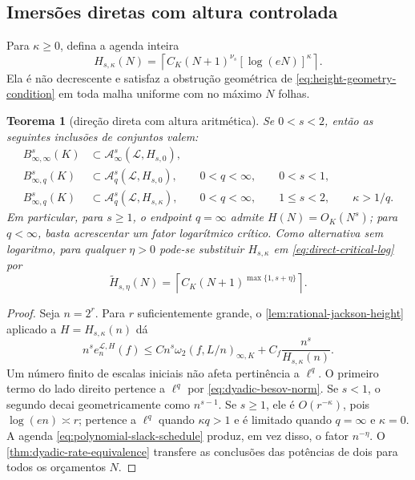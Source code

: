 \documentclass[11pt,a4paper]{article}
\newtheorem{theorem}{Teorema}[section]
\theoremstyle{definition}
\theoremstyle{remark}
\newcommand{\Library}{\mathcal{L}}
\begin{document}
\subsection{Imersões diretas com altura controlada}

Para $\kappa\ge0$, defina a agenda inteira
\begin{equation}
 H_{s,\kappa}(N)
 =\left\lceil C_K(N+1)^{\nu_s}
        [\log(eN)]^\kappa\right\rceil.
 \label{eq:corrected-height-schedule}
\end{equation}
Ela é não decrescente e satisfaz a obstrução geométrica de
\eqref{eq:height-geometry-condition} em toda malha uniforme com no máximo
$N$ folhas.

\begin{theorem}[direção direta com altura aritmética]
\label{thm:direct-besov-height}
Se $0<s<2$, então as seguintes inclusões de conjuntos valem:
\begin{align}
 B^s_{\infty,\infty}(K)
 &\subset
 \mathscr A^s_\infty(\Library,H_{s,0}),
 \label{eq:direct-endpoint}\\
 B^s_{\infty,q}(K)
 &\subset
 \mathscr A^s_q(\Library,H_{s,0}),
 &&0<q<\infty,\qquad 0<s<1,
 \label{eq:direct-subcritical}\\
 B^s_{\infty,q}(K)
 &\subset
 \mathscr A^s_q(\Library,H_{s,\kappa}),
 &&0<q<\infty,\qquad 1\le s<2,\qquad\kappa>1/q.
 \label{eq:direct-critical-log}
\end{align}
Em particular, para $s\ge1$, o endpoint $q=\infty$ admite
$H(N)=O_K(N^s)$; para $q<\infty$, basta acrescentar um fator logarítmico
crítico. Como
alternativa sem logaritmo, para qualquer $\eta>0$ pode-se substituir
$H_{s,\kappa}$ em \eqref{eq:direct-critical-log} por
\begin{equation}
 \widetilde H_{s,\eta}(N)
 =\left\lceil C_K(N+1)^{\max\{1,s+\eta\}}\right\rceil.
 \label{eq:polynomial-slack-schedule}
\end{equation}
\end{theorem}

\begin{proof}
Seja $n=2^r$. Para $r$ suficientemente grande, o
\cref{lem:rational-jackson-height} aplicado a
$H=H_{s,\kappa}(n)$ dá
\begin{equation}
 n^s e_n^{\Library,H}(f)
 \le C n^s\omega_2(f,L/n)_{\infty,K}
     +C_f\frac{n^s}{H_{s,\kappa}(n)}.
 \label{eq:direct-sequence-bound}
\end{equation}
Um número finito de escalas iniciais não afeta pertinência a $\ell^q$. O
primeiro termo do lado direito pertence a $\ell^q$ por
\eqref{eq:dyadic-besov-norm}. Se $s<1$, o segundo decai geometricamente como
$n^{s-1}$. Se $s\ge1$, ele é $O(r^{-\kappa})$, pois
$\log(en)\asymp r$; pertence a $\ell^q$ quando $\kappa q>1$ e é limitado
quando $q=\infty$ e $\kappa=0$. A agenda
\eqref{eq:polynomial-slack-schedule} produz, em vez disso, o fator
$n^{-\eta}$. O \cref{thm:dyadic-rate-equivalence} transfere as conclusões
das potências de dois para todos os orçamentos $N$.
\end{proof}
\end{document}

